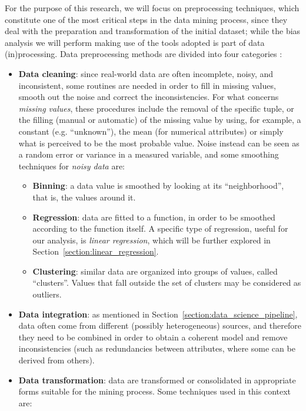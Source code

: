 For the purpose of this research, we will focus on preprocessing techniques, which constitute one of the most critical steps in the data mining process, since they deal with the preparation and transformation of the initial dataset; while the bias analysis we will perform making use of the tools adopted is part of data (in)processing. Data preprocessing methods are divided into four categories \cite{tamilselvi2015efficient}:
\begin{itemize}
\item \textbf{Data cleaning}: since real-world data are often incomplete, noisy, and inconsistent, some routines are needed in order to fill in missing values, smooth out the noise and correct the inconsistencies.
For what concerns \textit{missing values}, these procedures include the removal of the specific tuple, or the filling (manual or automatic) of the missing value by using, for example, a constant (e.g. ``unknown''), the mean (for numerical attributes) or simply what is perceived to be the most probable value.
Noise instead can be seen as a random error or variance in a measured variable, and some smoothing techniques for \textit{noisy data} are:
\begin{itemize}
\item \textbf{Binning}: a data value is smoothed by looking at its ``neighborhood'', that is, the values around it.
\item \textbf{Regression}: data are fitted to a function, in order to be smoothed according to the function itself. A specific type of regression, useful for our analysis, is \textit{linear regression}, which will be further explored in Section~\ref{section:linear_regression}.
\item \textbf{Clustering}: similar data are organized into groups of values, called ``clusters''. Values that fall outside the set of clusters may be considered as outliers.
\end{itemize}
\item \textbf{Data integration}: as mentioned in Section~\ref{section:data_science_pipeline}, data often come from different (possibly heterogeneous) sources, and therefore they need to be combined in order to obtain a coherent model and remove inconsistencies (such as redundancies between attributes, where some can be derived from others).
\item \textbf{Data transformation}: data are transformed or consolidated in appropriate forms suitable for the mining process. Some techniques used in this context are:
\begin{itemize}

\end{itemize}
\end{itemize}
